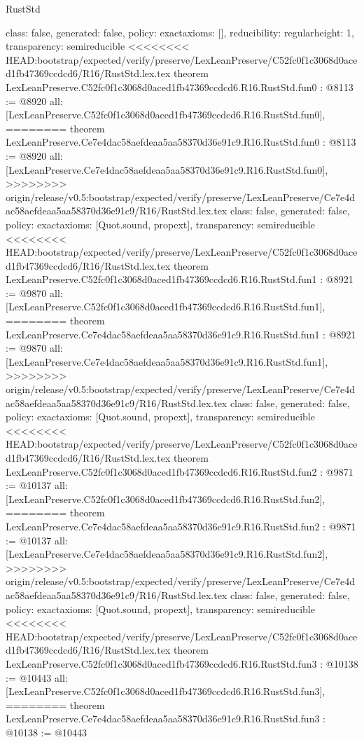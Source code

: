 \begin{lexlean}{RustStd}
\begin{coremodule}
{\begin{coremodule}
{{{  class: false,
  generated: false,
  policy: exact{axioms: []},
  reducibility: regular{height: 1},
  transparency: semireducible
}
<<<<<<<< HEAD:bootstrap/expected/verify/preserve/LexLeanPreserve/C52fc0f1c3068d0aced1fb47369ccdcd6/R16/RustStd.lex.tex
theorem LexLeanPreserve.C52fc0f1c3068d0aced1fb47369ccdcd6.R16.RustStd.fun0 : @8113 := @8920 {
  all: [LexLeanPreserve.C52fc0f1c3068d0aced1fb47369ccdcd6.R16.RustStd.fun0],
========
theorem LexLeanPreserve.Ce7e4dac58aefdeaa5aa58370d36e91c9.R16.RustStd.fun0 : @8113 := @8920 {
  all: [LexLeanPreserve.Ce7e4dac58aefdeaa5aa58370d36e91c9.R16.RustStd.fun0],
>>>>>>>> origin/release/v0.5:bootstrap/expected/verify/preserve/LexLeanPreserve/Ce7e4dac58aefdeaa5aa58370d36e91c9/R16/RustStd.lex.tex
  class: false,
  generated: false,
  policy: exact{axioms: [Quot.sound, propext]},
  transparency: semireducible
}
<<<<<<<< HEAD:bootstrap/expected/verify/preserve/LexLeanPreserve/C52fc0f1c3068d0aced1fb47369ccdcd6/R16/RustStd.lex.tex
theorem LexLeanPreserve.C52fc0f1c3068d0aced1fb47369ccdcd6.R16.RustStd.fun1 : @8921 := @9870 {
  all: [LexLeanPreserve.C52fc0f1c3068d0aced1fb47369ccdcd6.R16.RustStd.fun1],
========
theorem LexLeanPreserve.Ce7e4dac58aefdeaa5aa58370d36e91c9.R16.RustStd.fun1 : @8921 := @9870 {
  all: [LexLeanPreserve.Ce7e4dac58aefdeaa5aa58370d36e91c9.R16.RustStd.fun1],
>>>>>>>> origin/release/v0.5:bootstrap/expected/verify/preserve/LexLeanPreserve/Ce7e4dac58aefdeaa5aa58370d36e91c9/R16/RustStd.lex.tex
  class: false,
  generated: false,
  policy: exact{axioms: [Quot.sound, propext]},
  transparency: semireducible
}
<<<<<<<< HEAD:bootstrap/expected/verify/preserve/LexLeanPreserve/C52fc0f1c3068d0aced1fb47369ccdcd6/R16/RustStd.lex.tex
theorem LexLeanPreserve.C52fc0f1c3068d0aced1fb47369ccdcd6.R16.RustStd.fun2 : @9871 := @10137 {
  all: [LexLeanPreserve.C52fc0f1c3068d0aced1fb47369ccdcd6.R16.RustStd.fun2],
========
theorem LexLeanPreserve.Ce7e4dac58aefdeaa5aa58370d36e91c9.R16.RustStd.fun2 : @9871 := @10137 {
  all: [LexLeanPreserve.Ce7e4dac58aefdeaa5aa58370d36e91c9.R16.RustStd.fun2],
>>>>>>>> origin/release/v0.5:bootstrap/expected/verify/preserve/LexLeanPreserve/Ce7e4dac58aefdeaa5aa58370d36e91c9/R16/RustStd.lex.tex
  class: false,
  generated: false,
  policy: exact{axioms: [Quot.sound, propext]},
  transparency: semireducible
}
<<<<<<<< HEAD:bootstrap/expected/verify/preserve/LexLeanPreserve/C52fc0f1c3068d0aced1fb47369ccdcd6/R16/RustStd.lex.tex
theorem LexLeanPreserve.C52fc0f1c3068d0aced1fb47369ccdcd6.R16.RustStd.fun3 : @10138 := @10443 {
  all: [LexLeanPreserve.C52fc0f1c3068d0aced1fb47369ccdcd6.R16.RustStd.fun3],
========
theorem LexLeanPreserve.Ce7e4dac58aefdeaa5aa58370d36e91c9.R16.RustStd.fun3 : @10138 := @10443 {
}}}}}}}
\end{coremodule}}
\end{coremodule}
\end{lexlean}

